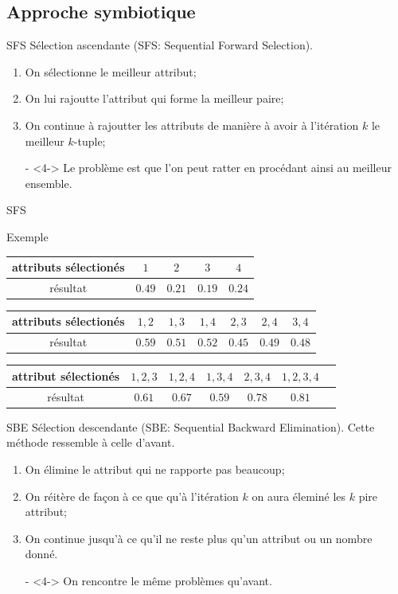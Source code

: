 \documentclass[9pt]{beamer}
\begin{document}
	\subsection[symbiotic approach]{Approche symbiotique}
	\begin{frame}{SFS}
		Sélection ascendante (SFS\@: Sequential Forward Selection).
		\begin{enumerate}
		\item<1-> On sélectionne le meilleur attribut;
		\item<2-> On lui rajoutte l'attribut qui forme la meilleur paire;
		\item<3-> On continue à rajoutter les attributs de manière à avoir à l'itération $k$ le meilleur $k$-tuple;
		\item[-]<4-> Le problème est que l'on peut ratter en procédant ainsi au meilleur ensemble.
		\end{enumerate}
	\end{frame}

	\begin{frame}{SFS}
		\begin{block}{Exemple}
			\begin{longtable}{c c c c c}
				\toprule
				attributs sélectionés & $1$ & $2$ & $3$ & $4$\\
				\midrule
				résultat& $0.49$ & $0.21$ & $0.19$ &$0.24$\\
				\bottomrule
			\end{longtable}
			\begin{longtable}{c c c c c c c}
				\toprule
				attributs sélectionés & $1,2$ & $1,3$ & $1,4$ & $2,3$ & $2,4$ & $3,4$\\
				\midrule
				résultat & $0.59$ & $0.51$ & $0.52$ & $0.45$ & $0.49$ & $0.48$\\
				\bottomrule
			\end{longtable}
			\begin{longtable}{c c c c c c c}
				\toprule
				attribut sélectionés & $1,2,3$ & $1,2,4$ & $1,3,4$ & $2,3,4$ & $1,2,3,4$\\
				\midrule
				résultat & $0.61$ & $0.67$ & $0.59$ & $0.78$ & $0.81$\\
				\bottomrule
			\end{longtable}
		\end{block}
	\end{frame}

	\begin{frame}{SBE}
		Sélection descendante (SBE\@: Sequential Backward Elimination).
		Cette méthode ressemble à celle d'avant.
		\begin{enumerate}
		\item<1-> On élimine le attribut qui ne rapporte pas beaucoup;
		\item<2-> On réitère de façon à ce que qu'à l'itération $k$ on aura éleminé les $k$ pire attribut;
		\item<3-> On continue jusqu'à ce qu'il ne reste plus qu'un attribut ou un nombre donné.
		\item[-]<4-> On rencontre le même problèmes qu'avant.
		\end{enumerate}
	\end{frame}
\end{document}
